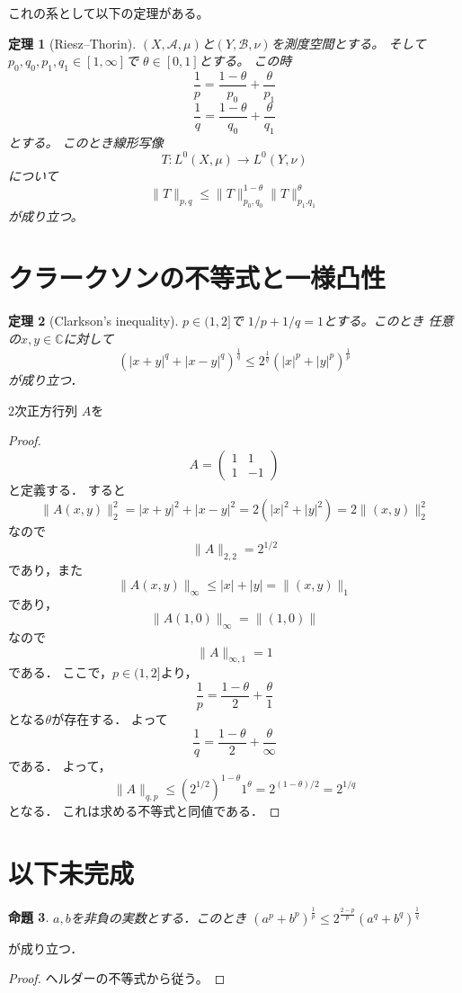 \documentclass[leqno]{jsarticle}
\newtheorem{thm}{定理}
\newtheorem{prop}[thm]{命題}
\newcommand{\cc}{\mathbb{C}}
\begin{document}
これの系として以下の定理がある。
\begin{thm}[Riesz--Thorin]
$(X,\mathcal{A},\mu)$と$(Y,\mathcal{B}, \nu)$を測度空間とする。
そして$p_0, q_0, p_1,q_1 \in [1,\infty] $で
$\theta\in [0,1]$とする。
この時
\[
\frac{1}{p}=\frac{1-\theta}{p_0}+\frac{\theta}{p_1}
\]
\[
\frac{1}{q}=\frac{1-\theta}{q_0}+\frac{\theta}{q_1}
\]
とする。
このとき線形写像
\[
T:L^0(X,\mu)\to L^0(Y,\nu)
\]
について
\[
\|T\|_{p,q}\le \|T\|_{p_0, q_0}^{1-\theta}\|T\|_{p_1.q_1}^{\theta}
\]
が成り立つ。
\end{thm}




\section{クラークソンの不等式と一様凸性}

\begin{thm}[Clarkson's inequality]
$p\in (1, 2]$で $1/p+1/q=1$とする。このとき
任意の$x,y\in \cc$に対して
\[
(|x+y|^q+|x-y|^q)^{\frac{1}{q}}\le 2^{\frac{1}{q}}(|x|^p+|y|^p)^{\frac{1}{p}}
\]
が成り立つ．
\end{thm}
$2$次正方行列
$A$を
\begin{proof}
\[
A = \left(
    \begin{array}{cc}
      1 & 1  \\
      1 & -1 
    \end{array}
  \right)
\]
と定義する．
すると
\[
\|A(x,y)\|_2^2=|x+y|^2+|x-y|^2=2(|x|^2+|y|^2)=2\|(x,y)\|_2^2
\]
なので
\[
\|A\|_{2,2}=2^{1/2}
\]
であり，また
\[
\|A(x,y)\|_{\infty}\le |x|+|y|=\|(x,y)\|_1
\]
であり，
\[
\|A(1,0)\|_{\infty}=\|(1,0)\|
\]
なので
\[
\|A\|_{\infty,1}=1
\]
である．
ここで，$p\in (1,2]$より，
\[
\frac{1}{p}=\frac{1-\theta}{2}+\frac{\theta}{1}
\]
となる$\theta$が存在する．
よって
\[
\frac{1}{q}=\frac{1-\theta}{2}+\frac{\theta}{\infty}
\]
である．
よって，
\[
\|A\|_{q,p}\le (2^{1/2})^{1-\theta}1^{\theta}
=2^{(1-\theta)/2}=2^{1/q}
\]
となる．
これは求める不等式と同値である．
\end{proof}


\section{以下未完成}
\begin{prop}
$a, b$を非負の実数とする．このとき
$(a^p+b^p)^{\frac{1}{p}}\le 2^{\frac{2-p}{p}}(a^q+b^q)^{\frac{1}{q}}$
\end{prop}
が成り立つ．
\begin{proof}
ヘルダーの不等式から従う。
\end{proof}
\end{document}
